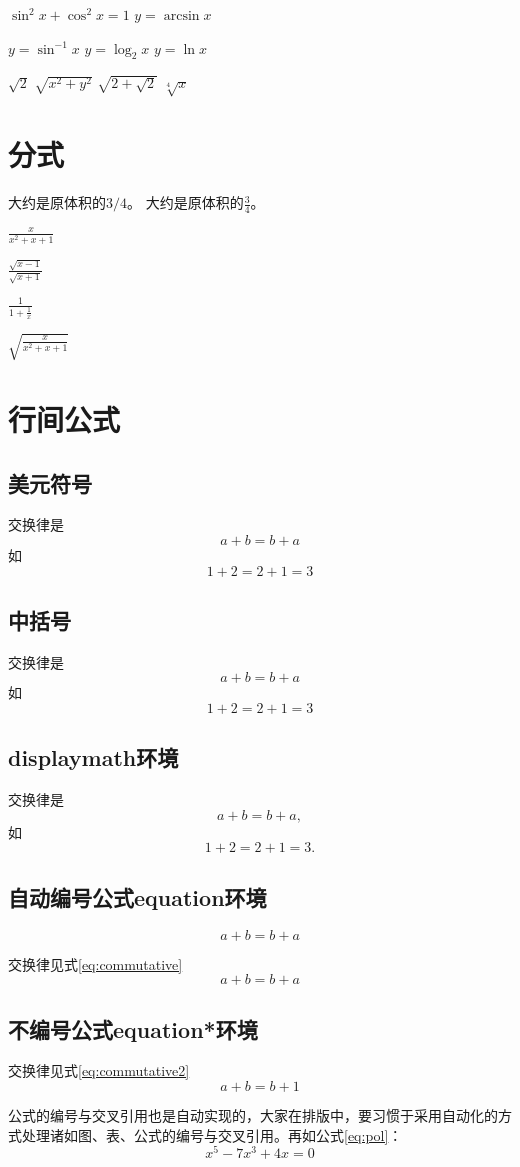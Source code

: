 \documentclass{article}
\begin{document}
    $\sin^2 x + \cos^2 x = 1$
    $y = \arcsin x$

    $y = \sin^{-1} x$
    $y = \log_2 x$
    $y = \ln x$

    $\sqrt{2}$
    $\sqrt{x^2 + y^2}$
    $\sqrt{2 + \sqrt{2}}$
    $\sqrt[4]{x}$
    \section{分式}
    大约是原体积的$3/4$。
    大约是原体积的$\frac{3}{4}$。

    $\frac{x}{x^2 + x + 1}$

    $\frac{\sqrt{x-1}}{\sqrt{x+1}}$

    $\frac{1}{1 + \frac{1}{x}}$

    $\sqrt{\frac{x}{x^2 + x + 1}}$
    \section{行间公式}
    \subsection{美元符号}
    交换律是
    $$a+b=b+a$$
    如
    $$1+2=2+1=3$$
    \subsection{中括号}
    交换律是
    \[a+b=b+a\]
    如
    \[1+2=2+1=3\]
    \subsection{displaymath环境}
    交换律是
    \begin{displaymath}
        a+b=b+a,
    \end{displaymath}
    如
    \begin{displaymath}
        1+2=2+1=3.
    \end{displaymath}
    \subsection{自动编号公式equation环境}
    \begin{equation}
        a+b=b+a
    \end{equation}

    交换律见式\ref{eq:commutative}
    \begin{equation}
        a+b=b+a \label{eq:commutative}
    \end{equation}
    \subsection{不编号公式equation*环境}  %
    交换律见式\ref{eq:commutative2}
    \begin{equation*}
        a+b=b+1 \label{eq:commutative2}
    \end{equation*}

    公式的编号与交叉引用也是自动实现的，大家在排版中，要习惯于采用自动化的方式处理诸如图、表、公式的编号与交叉引用。再如公式\ref{eq:pol}：
    \begin{equation}
        x^5 - 7x^3 + 4x =0 \label{eq:pol}
    \end{equation}
    
\end{document}
